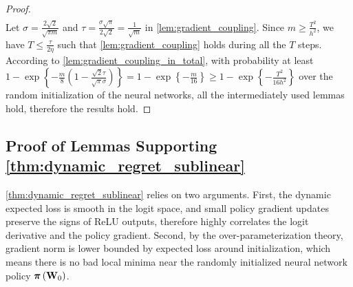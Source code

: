 \begin{proof}
\begin{equation*}
\begin{split}
\end{split}
\end{equation*}
Let $\sigma = \frac{2 \sqrt{2}}{\sqrt{\pi m}}$ and $\tau = \frac{\sigma \sqrt{\pi}}{2 \sqrt{2}} = \frac{1}{\sqrt{m}}$ in \cref{lem:gradient_coupling}. Since $m \ge \frac{T^2}{h^2}$, we have $T \le \frac{\tau}{2 \eta}$ such that \cref{lem:gradient_coupling} holds during all the $T$ steps. According to \cref{lem:gradient_coupling_in_total}, with probability at least $1 - \exp\left\{ - \frac{m}{8} \left( 1 - \frac{\sqrt{2}\tau}{\sqrt{\pi}\sigma} \right) \right\} = 1 - \exp\left\{ - \frac{m}{16} \right\} \ge 1 - \exp\left\{ - \frac{T^2}{16 h^2} \right\}$ over the random initialization of the neural networks, all the intermediately used lemmas hold, therefore the results hold.
\end{proof}

\subsection{Proof of Lemmas Supporting \cref{thm:dynamic_regret_sublinear}}

\cref{thm:dynamic_regret_sublinear} relies on two arguments. First, the dynamic expected loss is smooth in the logit space, and small policy gradient updates preserve the signs of ReLU outputs, therefore highly correlates the logit derivative and the policy gradient. Second, by the over-parameterization theory, gradient norm is lower bounded by expected loss around initialization, which means there is no bad local minima near the randomly initialized neural network policy ${\boldsymbol{\pi}}\left( {\mathbf{W}}_0 \right)$.

